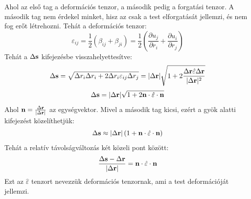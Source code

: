 \documentclass[a4paper,12pt]{article}
\begin{document}
Ahol az első tag a deformációs tenzor, a második pedig a forgatási tenzor. A második tag nem érdekel minket, hisz az csak a test elforgatását jellemzi, és nem fog erőt létrehozni. Tehát a deformációs tenzor:
\begin{equation}
    \varepsilon_{ij} = \frac{1}{2} (\beta_{ij} + \beta_{ji}) = \frac{1}{2} \left(\frac{\partial u_j}{\partial r_i} + \frac{\partial u_i}{\partial r_j}\right)
\end{equation}
Tehát a $\Delta \bold{s}$ kifejezésbe visszahelyettesítve:
\begin{equation}
    \Delta \bold{s} = \sqrt{\Delta r_i \Delta r_i + 2 \Delta r_i \varepsilon_{ij} \Delta r_j} = |\Delta \bold{r}| \sqrt{1 + 2 \frac{\Delta \bold{r} \hat{\varepsilon} \Delta \bold{r}}{|\Delta \bold{r}|^2}}
\end{equation}
\begin{equation}
    \Delta \bold{s} = |\Delta \bold{r}| \sqrt{1 + 2 \bold{n} \cdot \hat{\varepsilon} \cdot \bold{n}}
\end{equation}
Ahol $\bold{n} = \frac{\Delta \bold{r}}{|\Delta \bold{r}|}$ az egységvektor. Mivel a második tag kicsi, ezért a gyök alatti kifejezést közelíthetjük:
\begin{equation}
    \Delta \bold{s} \approx |\Delta \bold{r}| \left(1 + \bold{n} \cdot \hat{\varepsilon} \cdot \bold{n}\right)
\end{equation}
Tehát a relatív távolságváltozás két közeli pont között:
\begin{equation}
    \frac{\Delta \bold{s} - \Delta \bold{r}}{|\Delta \bold{r}|} = \bold{n} \cdot \hat{\varepsilon} \cdot \bold{n}
\end{equation}
Ezt az $\hat{\varepsilon}$ tenzort nevezzük deformációs tenzornak, ami a test deformációját jellemzi.
\end{document}
